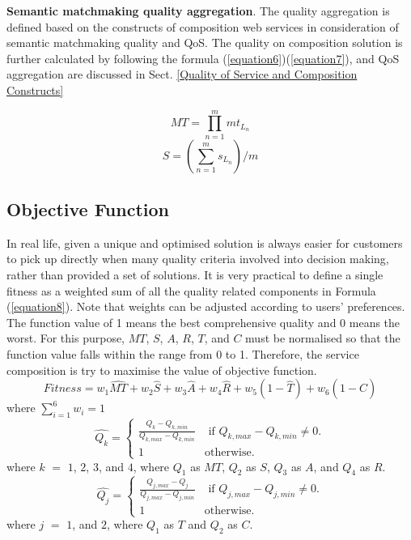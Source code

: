 \documentclass{IEEEtran}
\begin{document}
\textbf{Semantic matchmaking quality aggregation}. The quality aggregation is defined based on the constructs of composition web services in consideration of semantic matchmaking quality and QoS. The quality on composition solution is further calculated by following the formula (\ref{equation6})(\ref{equation7}), and QoS aggregation are discussed in Sect. \ref{Quality of Service and Composition Constructs}

\begin{equation}
\label{equation6}
MT {=} \prod_{n=1}^{m} mt_ {L_{n}}
\end{equation}
\begin{equation}
\label{equation7}
S {=} (\sum_{n=1}^m s_ {L_{n}})/m
\end{equation}


\subsection{Objective Function}
In real life, given a unique and optimised solution is always easier for customers to pick up directly when many quality criteria involved into decision making, rather than provided a set of solutions. It is very practical to define a single fitness as a weighted sum of all the quality related components in Formula (\ref{equation8}). Note that weights can be adjusted according to users' preferences. The function value of 1 means the best comprehensive quality and 0 means the worst. For this purpose, $MT$, $S$, $A$, $R$, $T$, and $C$ must be normalised so that the function value falls within the range from 0 to 1. Therefore, the service composition is try to maximise the value of objective function.
\vspace{-0.2cm}
\begin{equation}
\label{equation8}
Fitness = w_1 \hat{MT} + w_2 \hat{S} + w_3 \hat{A} + w_4 \hat{R} + w_5(1 - \hat{T}) + w_6(1 - \hat{C})
\end{equation}
\noindent where $\sum_{i=1}^{6} w_i = 1$
\\
\vspace{-0.2cm}
\begin{equation}
\label{equation9}
\hat{Q_k} = 
\begin{cases}
	\frac{Q_k - Q_{k, min}}{Q_{k, max} - Q_{k, min}} & \text{ if }Q_{k, max} - Q_{k, min} \neq 0.\\
	1 & \mathrm{ otherwise}.
\end{cases}
\end{equation}
\noindent where $k$ $=$ $1$, $2$, $3$, and $4$, where $Q_1$ as $MT$, $Q_2$ as $S$, $Q_3$ as $A$, and $Q_4$ as $R$.
\begin{equation}
\label{equation10}
\hat{Q_j} = 
\begin{cases}
	\frac{Q_{j,max} - Q_j}{Q_{j, max} - Q_{j, min}} & \text{ if }Q_{j, max} - Q_{j, min} \neq 0.\\
	1 & \mathrm{ otherwise}.
\end{cases}
\end{equation}
\noindent where $j$ $=$ $1$, and $2$, where $Q_1$ as $T$ and $Q_2$ as $C$.
\end{document}
